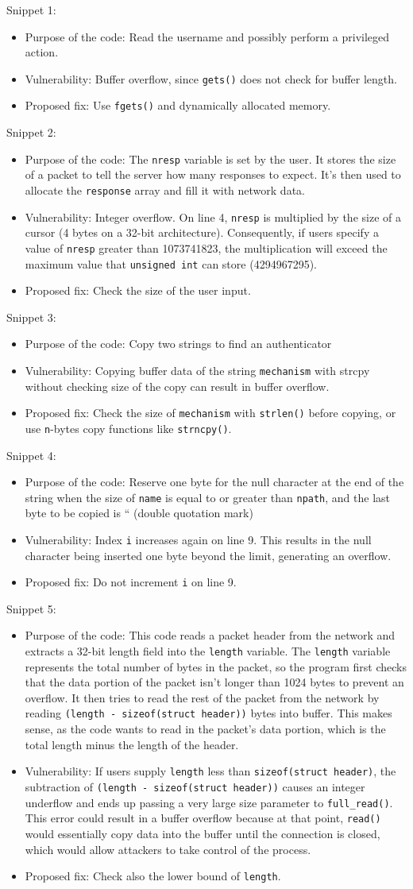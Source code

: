 \documentclass[12pt,a4paper]{article}
\newcommand{\solution}[3]{
\begin{itemize}
\item Purpose of the code: #1
\item Vulnerability: #2
\item Proposed fix: #3
\end{itemize}
}
\begin{document}
\noindent
Snippet 1:
\solution
{Read the username and possibly perform a privileged action.}
{Buffer overflow, since \texttt{gets()} does not check for buffer length.}
{Use \texttt{fgets()} and dynamically allocated memory.}

\noindent
Snippet 2:
\solution
{The \texttt{nresp} variable is set by the user. It stores the size of a packet to tell the server how many responses to expect. It's then used to allocate the \texttt{response} array and fill it with network data.}
{Integer overflow. On line 4, \texttt{nresp} is multiplied by the size of a cursor (4 bytes on a 32-bit architecture). Consequently, if users specify a value of \texttt{nresp} greater than 1073741823, the multiplication will exceed the maximum value that \texttt{unsigned int} can store (4294967295).}
{Check the size of the user input.}

\noindent
Snippet 3:
\solution
{Copy two strings to find an authenticator}
{Copying buffer data of the string \texttt{mechanism} with strcpy without checking size of the copy can result in buffer overflow.}
{Check the size of \texttt{mechanism} with \texttt{strlen()} before copying, or use \texttt{n}-bytes copy functions like \texttt{strncpy()}.}

\noindent
Snippet 4:
\solution
{Reserve one byte for the null character at the end of the string when the size of \texttt{name} is equal to or greater than \texttt{npath}, and the last byte to be copied is “ (double quotation mark)}
{Index \texttt{i} increases again on line 9. This results in the null character being inserted one byte beyond the limit, generating an overflow.}
{Do not increment \texttt{i} on line 9.}

\noindent
Snippet 5:
\solution
{This code reads a packet header from the network and extracts a 32-bit length
field into the \texttt{length} variable. The \texttt{length} variable represents the total number of bytes in the packet, so the program first checks that the data portion of the packet isn't longer than 1024 bytes to prevent an overflow. It then tries to read the rest of the packet from the network by reading \texttt{(length - sizeof(struct header))} bytes into buffer. This makes sense, as the code wants to read in the packet's data portion, which is the total length minus the length of the header.}
{If users supply \texttt{length} less than \texttt{sizeof(struct header)}, the subtraction of \texttt{(length - sizeof(struct header))} causes an integer underflow and ends up passing a very large size parameter to \texttt{full\_read()}. This error could result in a buffer overflow because at that point, \texttt{read()} would essentially copy data into the buffer until the connection is closed, which would allow attackers to take control of the process.}
{Check also the lower bound of \texttt{length}.}
\end{document}
